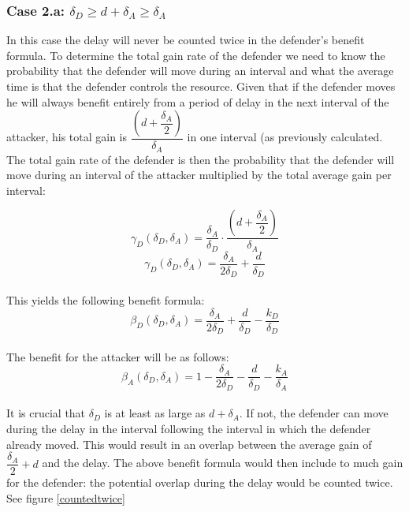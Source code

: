 \subsubsection*{\textbf{Case 2.a:} $ \delta_{D} \geq d + \delta_{A} \geq \delta_{A}$}
In this case the delay will never be counted twice in the defender's  benefit formula. To determine the total gain rate of the defender we need to know the probability that the defender will move during an interval and what the average time is that the defender controls the resource. Given that if the defender moves he will always benefit entirely from a period of delay in the next interval of the attacker, his total gain is $\dfrac{(d+\dfrac{\delta_{A}}{2})}{\delta_{A}}$ in one interval (as previously calculated. The total gain  rate of the defender is then the probability that the defender will move during an interval of the attacker multiplied by the total average gain per interval: 

\begin{equation*}\label{first}
\gamma_{D}(\delta_{D},\delta_{A}) = \dfrac{\delta_{A}}{\delta_{D}} \cdot \dfrac{(d+\dfrac{\delta_{A}}{2})}{\delta_{A}} 
\end{equation*}
\begin{equation*}\label{first}
\gamma_{D}(\delta_{D},\delta_{A}) = \dfrac{\delta_{A}}{2\delta_{D}} + \dfrac{d}{\delta_{D}} 
\end{equation*}\\
This yields the following benefit formula:
\begin{equation}\label{benfcase2a:defender}
\beta_{D}(\delta_{D},\delta_{A}) = \dfrac{\delta_{A}}{2\delta_{D}} + \dfrac{d}{\delta_{D}} - \dfrac{k_{D}}{ \delta_{D}}
\end{equation}\\

The benefit for the attacker will be as follows:
\begin{equation}\label{benfcase2a:attacker}
\beta_{A}(\delta_{D},\delta_{A}) = 1 -\dfrac{\delta_{A}}{2\delta_{D}} - \dfrac{d}{\delta_{D}} - \dfrac{k_{A}}{ \delta_{A}}
\end{equation}\\



It is crucial that $ \delta_{D}$ is at least as large as $d + \delta_{A}$. If not, the defender can move during the delay in the interval following the interval in which the defender already moved. This would result in an overlap between the average gain of $\dfrac{\delta_{A}}{2} +d$ and the delay. The above benefit formula would then include to much gain for the defender: the potential overlap during the delay would be counted twice. See figure \ref{countedtwice}\\

